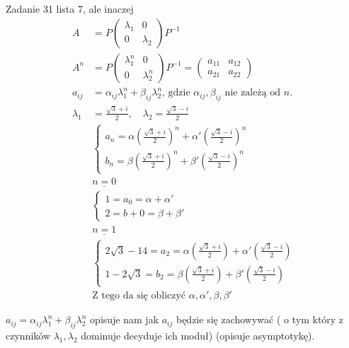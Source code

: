 \begin{prz} Zadanie 31 lista 7, ale inaczej
    \begin{align*}
        A &= P \begin{pmatrix} \lambda_1 & 0 \\ 0 & \lambda_2 \end{pmatrix} P^{-1} \\
        A^n &= P \begin{pmatrix} \lambda_1^n & 0 \\ 0 & \lambda_2^n \end{pmatrix} P^{-1} = 
        \begin{pmatrix} a_{11} & a_{12} \\ a_{21} & a_{22} \end{pmatrix} \\ 
        a_{ij} &= \alpha_{ij} \lambda_1^n + \beta_{ij} \lambda_2^n \text{, gdzie } \alpha_{ij},\beta_{ij} 
        \text{ nie zależą od } n. \\
        \lambda_1 &= \frac{\sqrt{3}+i}{2}, \quad \lambda_2 = \frac{\sqrt{3}-i}{2} \\ 
        &\begin{cases}
            a_n = \alpha (\frac{\sqrt{3}+i}{2})^n + \alpha' (\frac{\sqrt{3}-i}{2})^n \\ 
            b_n = \beta (\frac{\sqrt{3}+i}{2})^n + \beta' (\frac{\sqrt{3}-i}{2})^n 
        \end{cases} \\
        &\underline{n=0} \\ 
        &\begin{cases}
            1 = a_0 = \alpha + \alpha' \\ 
            2 = b+0 = \beta + \beta' 
        \end{cases} \\ 
        &\underline{n=1} \\ 
        &\begin{cases}
            2\sqrt{3} - 14 = a_2 = \alpha (\frac{\sqrt{3}+i}{2}) + \alpha' (\frac{\sqrt{3}-i}{2}) \\ 
            1 - 2\sqrt{3} = b_2 = \beta (\frac{\sqrt{3}+i}{2}) + \beta' (\frac{\sqrt{3}-i}{2})
        \end{cases} \\ 
        &\text{Z tego da się obliczyć } \alpha,\alpha',\beta,\beta'
    \end{align*}
\end{prz} 
\begin{uw} $a_{ij} = \alpha_{ij} \lambda_1 ^n + \beta_{ij} \lambda^n_2$ opisuje nam jak $a_{ij}$ będzie się 
    zachowywać ( o tym który z czynników $\lambda_1,\lambda_2$ dominuje decyduje ich moduł) 
    (opisuje asymptotykę). \end{uw}
